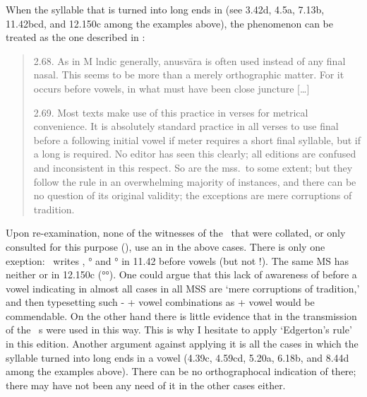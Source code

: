 \noindent
When the syllable that is turned into long ends in 
(see 3.42d, 4.5a, 7.13b, 11.42bcd, and 12.150c among the examples above), 
the phenomenon can be treated as the one described in 
:

\begin{quote}
2.68. As in M lndic generally, anusvāra is often used
instead of any final nasal. This seems to be more than a
merely orthographic matter. For it occurs before vowels,
in what must have been close juncture [\dots] 

2.69. Most texts make use of this practice in verses
for metrical convenience. It is absolutely standard practice
in all verses to use final  before a following initial vowel
if meter requires a short final syllable, but  if a long is
required. No editor has seen this clearly; all editions are
confused and inconsistent in this respect. So are the mss.\ to 
some extent; but they follow the rule in an overwhelming
majority of instances, and there can be no question of its
original validity; the exceptions are mere corruptions of
tradition.
\end{quote}
  
\noindent
Upon re-examination, none of the witnesses of the \VSS\ that were collated, 
or only consulted for this purpose (\msCa\msCb\msCc\allowbreak\msNa\msNb\msNc\msM\msParis\msKoa\msKob),
use an  in the above cases. There is only one exeption:
\msM\ writes , ° 
and ° in 11.42 before vowels (but not
!). The same MS has neither 
 or  in 12.150c (°°).
One could argue that this lack of awareness of  before
a vowel indicating  in almost all cases in all MSS
are `mere corruptions of tradition,' and then typesetting
such - + vowel combinations as  + vowel 
would be commendable.
On the other hand there is little evidence that in the transmission
of the \VSS\ s were used in this way. This is why
I hesitate to apply `Edgerton's rule' in this edition. Another argument
against applying it is all the cases in which the syllable turned into long
ends in a vowel (4.39c, 4.59cd, 5.20a, 6.18b, and 8.44d among the
examples above). There can be no orthographocal indication of  there;
there may have not been any need of it in the other cases either.



